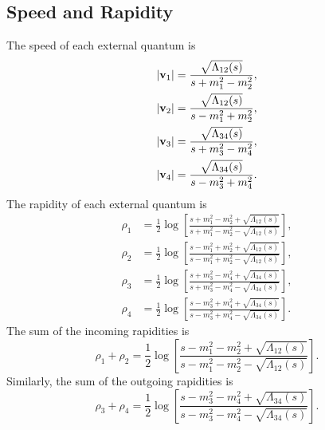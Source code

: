\subsection{Speed and Rapidity}
The speed of each external quantum is
\begin{align}
	\left\lvert \mathbf{v}_{1} \right\rvert &= \frac{\sqrt{\Lambda_{12}(s)}}{s + m_{1}^{2} - m_{2}^{2}}, \\
	\left\lvert \mathbf{v}_{2} \right\rvert &= \frac{\sqrt{\Lambda_{12}(s)}}{s - m_{1}^{2} + m_{2}^{2}}, \\
	\left\lvert \mathbf{v}_{3} \right\rvert &= \frac{\sqrt{\Lambda_{34}(s)}}{s + m_{3}^{2} - m_{4}^{2}}, \\
	\left\lvert \mathbf{v}_{4} \right\rvert &= \frac{\sqrt{\Lambda_{34}(s)}}{s - m_{3}^{2} + m_{4}^{2}}.
\end{align}
The rapidity of each external quantum is
\begin{align}
	\rho_{1} &= \frac{1}{2} \log{\left[ \frac{s + m_{1}^{2} - m_{2}^{2} + \sqrt{\Lambda_{12}(s)}}{s + m_{1}^{2} - m_{2}^{2} - \sqrt{\Lambda_{12}(s)}} \right]}, \\
	\rho_{2} &= \frac{1}{2} \log{\left[ \frac{s - m_{1}^{2} + m_{2}^{2} + \sqrt{\Lambda_{12}(s)}}{s - m_{1}^{2} + m_{2}^{2} - \sqrt{\Lambda_{12}(s)}} \right]}, \\
	\rho_{3} &= \frac{1}{2} \log{\left[ \frac{s + m_{3}^{2} - m_{4}^{2} + \sqrt{\Lambda_{34}(s)}}{s + m_{3}^{2} - m_{4}^{2} - \sqrt{\Lambda_{34}(s)}} \right]}, \\
	\rho_{4} &= \frac{1}{2} \log{\left[ \frac{s - m_{3}^{2} + m_{4}^{2} + \sqrt{\Lambda_{34}(s)}}{s - m_{3}^{2} + m_{4}^{2} - \sqrt{\Lambda_{34}(s)}} \right]}.
\end{align}
The sum of the incoming rapidities is
\begin{equation}
	\rho_{1} + \rho_{2} = \frac{1}{2} \log{ \left[ \frac{s - m_{1}^{2} - m_{2}^{2} + \sqrt{\Lambda_{12}(s)}}{s - m_{1}^{2} - m_{2}^{2} - \sqrt{\Lambda_{12}(s)}} \right] }.
\end{equation}
Similarly, the sum of the outgoing rapidities is
\begin{equation}
	\rho_{3} + \rho_{4} = \frac{1}{2} \log{ \left[ \frac{s - m_{3}^{2} - m_{4}^{2} + \sqrt{\Lambda_{34}(s)}}{s - m_{3}^{2} - m_{4}^{2} - \sqrt{\Lambda_{34}(s)}} \right] }.
\end{equation}
